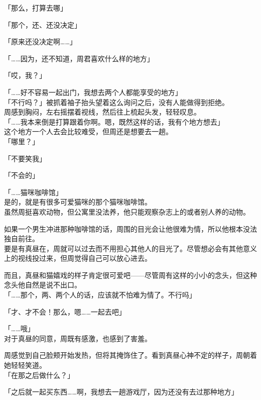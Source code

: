 「那么，打算去哪」

「那个，还、还没决定」

「原来还没决定啊……」

「……因为，还不知道，周君喜欢什么样的地方」

「哎，我？」

「……好不容易一起出门，我想去两个人都能享受的地方」\\

「不行吗？」被抓着袖子抬头望着这么询问之后，没有人能做得到拒绝。\\

周感到胸闷，左右摇摆着视线，然后往上梳起头发，轻轻叹息。\\

「……我本来倒是打算跟着你啊。嗯，既然这样的话，我有个地方想去」\\

这个地方一个人去会比较难受，但周还是想要去一趟。\\

「哪里？」

「不要笑我」

「不会的」

「……猫咪咖啡馆」\\

是的，就是有很多可爱猫咪的那个猫咪咖啡馆。\\

虽然周挺喜欢动物，但公寓里没法养，他只能观察杂志上的或者别人养的动物。

如果一个男生冲进那种咖啡馆的话，周围的目光会让他很难为情，所以他根本没法独自前往。\\

要是有真昼在，周就可以过去而不用担心其他人的目光了。尽管想必会有其他意义上的视线投过来，但周觉得自己可以放心进去。

而且，真昼和猫嬉戏的样子肯定很可爱吧——尽管周有这样的小小的念头，但这种念头他自然是说不出口。\\

「……那个，两、两个人的话，应该就不怕难为情了。不行吗」

「才、才不会！那么，嗯……一起去吧」

「……哦」\\

对于真昼的同意，周既有感激，也感到了害羞。

周感觉到自己脸颊开始发热，但将其掩饰住了。看到真昼心神不定的样子，周朝着她轻轻笑道。\\

「在那之后做什么？」

「之后就一起买东西……啊，我想去一趟游戏厅，因为还没有去过那种地方」\\

